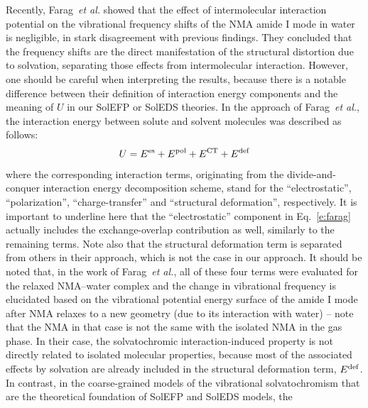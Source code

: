 \documentclass[a4paper,titlepage,twoside,fleqn,12pt]{book}
\begin{document}
\begin{refsection}
Recently, Farag~\emph{et al.} \citep{Farag.Ruiz-Lopez.Bastida.Monard.Ingrosso.JPCB.2015} 
showed that the effect of intermolecular
interaction potential on the vibrational frequency
shifts of the NMA amide I mode in water is negligible, in
stark disagreement with previous findings. \citep{Blasiak.Lee.Cho.JCP.2013,Blasiak.Cho.JCP.2014} 
They concluded that the frequency shifts are the
direct manifestation of the structural distortion due to solvation,
separating those effects from intermolecular interaction.
However, one should be careful when interpreting the results,
because there is a notable difference between their definition
of interaction energy components and the meaning of $U$ in our
SolEFP or SolEDS theories. In the approach of Farag~\emph{et al.},
the interaction energy between solute and solvent molecules
was described as follows:
%
\begin{equation} \label{e:farag}
 U =  E^{\rm es} + E^{\rm pol} + E^{\rm CT} + E^{\rm def}
\end{equation}
%
where the corresponding interaction terms, originating from
the divide\hyp{}and\hyp{}conquer interaction energy decomposition
scheme, \citep{vanderVaart.Merz.JPCA.1999} 
stand for the ``electrostatic'', ``polarization'', ``charge\hyp{}transfer''
and ``structural deformation'', respectively. It is
important to underline here that the ``electrostatic'' component
in Eq.~\eqref{e:farag} actually includes the exchange\hyp{}overlap contribution
as well, similarly to the remaining terms. \citep{vanderVaart.Merz.JPCA.1999} 
Note also that the
structural deformation term is separated from others in their
approach, which is not the case in our approach. 
It should be noted that, in the work of Farag~\emph{et al.}, 
all of these four terms were evaluated for the relaxed
NMA--water complex and the change in vibrational frequency
is elucidated based on the vibrational potential energy surface
of the amide I mode after NMA relaxes to a new geometry (due
to its interaction with water) -- note that the NMA in that case
is not the same with the isolated NMA in the gas phase. In their
case, the solvatochromic interaction\hyp{}induced property is not
directly related to isolated molecular properties, because most
of the associated effects by solvation are already included in
the structural deformation term, $E^{\rm def}$. In contrast, in the coarse\hyp{}grained
models of the vibrational solvatochromism \citep{Buckingham.ProcRSocLondonA.1958,
Buckingham.ProcRSocLondonA.1960,
Buckingham.TransFaradaySoc.1960,
Cho.JCP.2003,Cho.JCP.2009} 
that are
the theoretical foundation of SolEFP and SolEDS models, the

\end{refsection}
\end{document}
